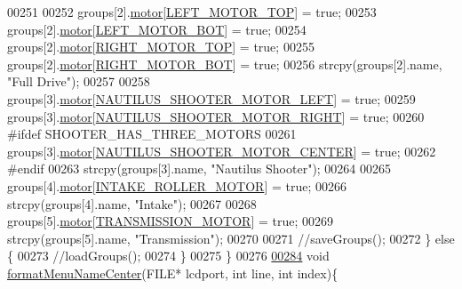 \begin{DoxyCode}
00251 
00252         groups[2].\hyperlink{struct_motor_group_a05d10a69eb1ae279fab13f9a009d84be}{motor}[\hyperlink{motors_8h_a3e06fbce97caed16e0a0f27f544587af}{LEFT\_MOTOR\_TOP}] = \textcolor{keyword}{true};
00253         groups[2].\hyperlink{struct_motor_group_a05d10a69eb1ae279fab13f9a009d84be}{motor}[\hyperlink{motors_8h_a43691a92e03fa5319b14f01193f47b9a}{LEFT\_MOTOR\_BOT}] = \textcolor{keyword}{true};
00254         groups[2].\hyperlink{struct_motor_group_a05d10a69eb1ae279fab13f9a009d84be}{motor}[\hyperlink{motors_8h_a306c5923dd0328c4bfc09255de9d124c}{RIGHT\_MOTOR\_TOP}] = \textcolor{keyword}{true};
00255         groups[2].\hyperlink{struct_motor_group_a05d10a69eb1ae279fab13f9a009d84be}{motor}[\hyperlink{motors_8h_a85c904d091f71ba7fc53a446524b6c61}{RIGHT\_MOTOR\_BOT}] = \textcolor{keyword}{true};
00256         strcpy(groups[2].name, \textcolor{stringliteral}{"Full Drive"});
00257 
00258         groups[3].\hyperlink{struct_motor_group_a05d10a69eb1ae279fab13f9a009d84be}{motor}[\hyperlink{motors_8h_a4a9fed3366effbbb942b907c131ae8bd}{NAUTILUS\_SHOOTER\_MOTOR\_LEFT}] = \textcolor{keyword}{true};
00259         groups[3].\hyperlink{struct_motor_group_a05d10a69eb1ae279fab13f9a009d84be}{motor}[\hyperlink{motors_8h_a3fa3054b1d74b733800c7b9252362334}{NAUTILUS\_SHOOTER\_MOTOR\_RIGHT}] = \textcolor{keyword}{true};
00260 \textcolor{preprocessor}{#ifdef SHOOTER\_HAS\_THREE\_MOTORS}
00261         groups[3].\hyperlink{struct_motor_group_a05d10a69eb1ae279fab13f9a009d84be}{motor}[\hyperlink{motors_8h_a681ecbcdbf9007fc5ccf3d67cdcfb505}{NAUTILUS\_SHOOTER\_MOTOR\_CENTER}] = \textcolor{keyword}{true};
00262 \textcolor{preprocessor}{#endif}
00263         strcpy(groups[3].name, \textcolor{stringliteral}{"Nautilus Shooter"});
00264 
00265         groups[4].\hyperlink{struct_motor_group_a05d10a69eb1ae279fab13f9a009d84be}{motor}[\hyperlink{motors_8h_a8ac783dc4e09804d3b2f7e3b6bbecad7}{INTAKE\_ROLLER\_MOTOR}] = \textcolor{keyword}{true};
00266         strcpy(groups[4].name, \textcolor{stringliteral}{"Intake"});
00267 
00268         groups[5].\hyperlink{struct_motor_group_a05d10a69eb1ae279fab13f9a009d84be}{motor}[\hyperlink{motors_8h_a7d8ac8902b66bb442bb27f9899aef13e}{TRANSMISSION\_MOTOR}] = \textcolor{keyword}{true};
00269         strcpy(groups[5].name, \textcolor{stringliteral}{"Transmission"});
00270 
00271         \textcolor{comment}{//saveGroups();}
00272     \} \textcolor{keywordflow}{else} \{
00273         \textcolor{comment}{//loadGroups();}
00274     \}
00275 \}
00276 
\hypertarget{lcddiag_8c_source.tex_l00284}{}\hyperlink{lcddiag_8c_a465a6cd66cde04199ae9641acce59d52}{00284} \textcolor{keywordtype}{void} \hyperlink{lcddiag_8c_a465a6cd66cde04199ae9641acce59d52}{formatMenuNameCenter}(FILE* lcdport, \textcolor{keywordtype}{int} line, \textcolor{keywordtype}{int} index)\{

\end{DoxyCode}

